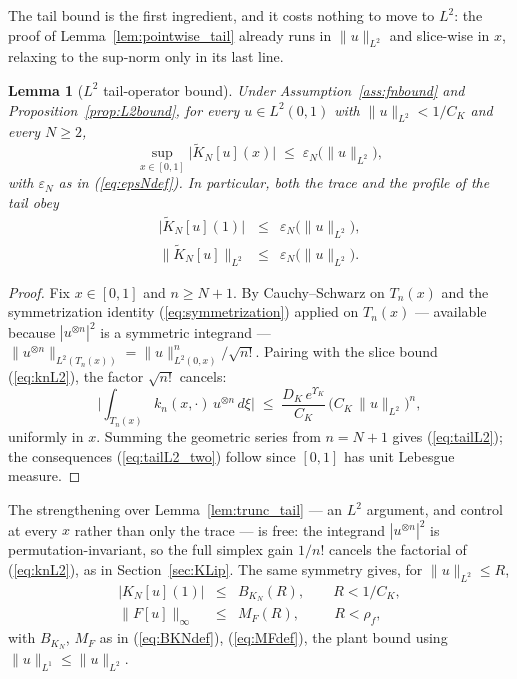 \documentclass[10pt,a4paper]{amsart}
\newtheorem{lemma}{Lemma}
\newcommand{\Ltwo}{L^2}
\newcommand{\eps}{\varepsilon}
\begin{document}
The tail bound is the first ingredient, and it costs nothing to move to $\Ltwo$: the proof of Lemma~\ref{lem:pointwise_tail} already runs in $\|u\|_{\Ltwo}$ and slice-wise in $x$, relaxing to the sup-norm only in its last line.

\begin{lemma}[$\Ltwo$ tail-operator bound]\label{lem:tailL2}
Under Assumption~\ref{ass:fnbound} and Proposition~\ref{prop:L2bound}, for every $u \in \Ltwo(0,1)$ with $\|u\|_{\Ltwo} < 1/C_K$ and every $N \ge 2$,
\begin{equation}
\sup_{x \in [0,1]} \bigl|\widetilde K_N[u](x)\bigr| \;\le\; \eps_N\bigl(\|u\|_{\Ltwo}\bigr),
\label{eq:tailL2}
\end{equation}
with $\eps_N$ as in (\ref{eq:epsNdef}). In particular, both the trace and the profile of the tail obey
\begin{eqnarray}
\bigl|\widetilde K_N[u](1)\bigr| &\le& \eps_N\bigl(\|u\|_{\Ltwo}\bigr), \nonumber \\
\bigl\|\widetilde K_N[u]\bigr\|_{\Ltwo} &\le& \eps_N\bigl(\|u\|_{\Ltwo}\bigr).
\label{eq:tailL2_two}
\end{eqnarray}
\end{lemma}

\begin{proof}
Fix $x \in [0,1]$ and $n \ge N+1$. By Cauchy--Schwarz on $T_n(x)$ and the symmetrization identity (\ref{eq:symmetrization}) applied on $T_n(x)$ --- available because $|u^{\otimes n}|^2$ is a symmetric integrand --- $\|u^{\otimes n}\|_{\Ltwo(T_n(x))} = \|u\|_{\Ltwo(0,x)}^n/\sqrt{n!}$. Pairing with the slice bound (\ref{eq:knL2}), the factor $\sqrt{n!}$ cancels:
\begin{equation}
\biggl|\int_{T_n(x)} k_n(x,\cdot)\, u^{\otimes n}\, d\xi\biggr| \;\le\; \frac{D_K\, e^{\Upsilon_K}}{C_K}\,\bigl(C_K\,\|u\|_{\Ltwo}\bigr)^n,
\label{eq:tailL2_pointwise}
\end{equation}
uniformly in $x$. Summing the geometric series from $n = N+1$ gives (\ref{eq:tailL2}); the consequences (\ref{eq:tailL2_two}) follow since $[0,1]$ has unit Lebesgue measure.
\end{proof}

The strengthening over Lemma~\ref{lem:trunc_tail} --- an $\Ltwo$ argument, and control at every $x$ rather than only the trace --- is free: the integrand $|u^{\otimes n}|^2$ is permutation-invariant, so the full simplex gain $1/n!$ cancels the factorial of (\ref{eq:knL2}), as in Section~\ref{sec:KLip}. The same symmetry gives, for $\|u\|_{\Ltwo} \le R$,
\begin{eqnarray}
\bigl|K_N[u](1)\bigr| &\le& B_{K_N}(R), \qquad R < 1/C_K, \nonumber \\
\|F[u]\|_\infty &\le& M_F(R), \qquad\ \ R < \rho_f,
\label{eq:BKN_MF_L2}
\end{eqnarray}
with $B_{K_N}$, $M_F$ as in (\ref{eq:BKNdef}), (\ref{eq:MFdef}), the plant bound using $\|u\|_{L^1} \le \|u\|_{\Ltwo}$.
\end{document}
